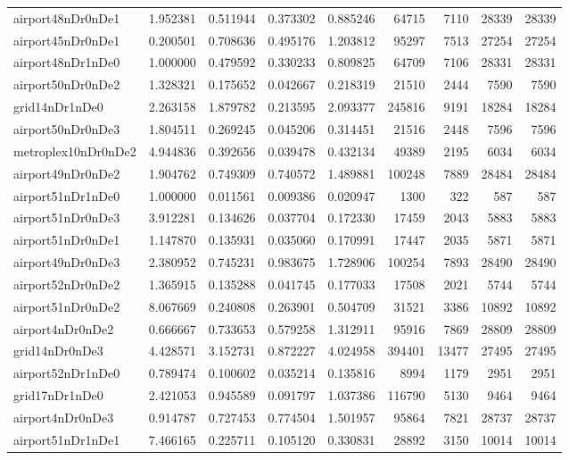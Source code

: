 \begin{longtable}{|l|r|r|r|r|r|r|r|r|}
airport48nDr0nDe1 & 1.952381 & 0.511944 & 0.373302 & 0.885246 & 64715 & 7110 & 28339 & 28339 \\
airport45nDr0nDe1 & 0.200501 & 0.708636 & 0.495176 & 1.203812 & 95297 & 7513 & 27254 & 27254 \\
airport48nDr1nDe0 & 1.000000 & 0.479592 & 0.330233 & 0.809825 & 64709 & 7106 & 28331 & 28331 \\
airport50nDr0nDe2 & 1.328321 & 0.175652 & 0.042667 & 0.218319 & 21510 & 2444 & 7590 & 7590 \\
grid14nDr1nDe0 & 2.263158 & 1.879782 & 0.213595 & 2.093377 & 245816 & 9191 & 18284 & 18284 \\
airport50nDr0nDe3 & 1.804511 & 0.269245 & 0.045206 & 0.314451 & 21516 & 2448 & 7596 & 7596 \\
metroplex10nDr0nDe2 & 4.944836 & 0.392656 & 0.039478 & 0.432134 & 49389 & 2195 & 6034 & 6034 \\
airport49nDr0nDe2 & 1.904762 & 0.749309 & 0.740572 & 1.489881 & 100248 & 7889 & 28484 & 28484 \\
airport51nDr1nDe0 & 1.000000 & 0.011561 & 0.009386 & 0.020947 & 1300 & 322 & 587 & 587 \\
airport51nDr0nDe3 & 3.912281 & 0.134626 & 0.037704 & 0.172330 & 17459 & 2043 & 5883 & 5883 \\
airport51nDr0nDe1 & 1.147870 & 0.135931 & 0.035060 & 0.170991 & 17447 & 2035 & 5871 & 5871 \\
airport49nDr0nDe3 & 2.380952 & 0.745231 & 0.983675 & 1.728906 & 100254 & 7893 & 28490 & 28490 \\
airport52nDr0nDe2 & 1.365915 & 0.135288 & 0.041745 & 0.177033 & 17508 & 2021 & 5744 & 5744 \\
airport51nDr0nDe2 & 8.067669 & 0.240808 & 0.263901 & 0.504709 & 31521 & 3386 & 10892 & 10892 \\
airport4nDr0nDe2 & 0.666667 & 0.733653 & 0.579258 & 1.312911 & 95916 & 7869 & 28809 & 28809 \\
grid14nDr0nDe3 & 4.428571 & 3.152731 & 0.872227 & 4.024958 & 394401 & 13477 & 27495 & 27495 \\
airport52nDr1nDe0 & 0.789474 & 0.100602 & 0.035214 & 0.135816 & 8994 & 1179 & 2951 & 2951 \\
grid17nDr1nDe0 & 2.421053 & 0.945589 & 0.091797 & 1.037386 & 116790 & 5130 & 9464 & 9464 \\
airport4nDr0nDe3 & 0.914787 & 0.727453 & 0.774504 & 1.501957 & 95864 & 7821 & 28737 & 28737 \\
airport51nDr1nDe1 & 7.466165 & 0.225711 & 0.105120 & 0.330831 & 28892 & 3150 & 10014 & 10014 \\

\end{longtable}

